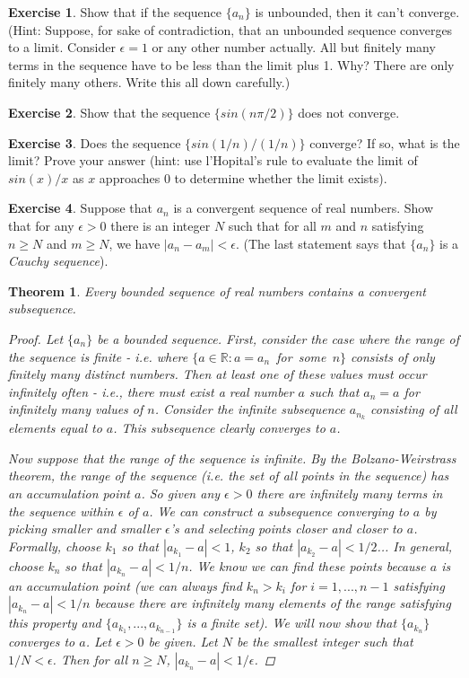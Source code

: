 \documentclass[11pt,a4paper]{report}
\theoremstyle{plain}
\newtheorem{thm}{Theorem}[section]
\theoremstyle{definition}
\newtheorem{exercise}{Exercise}[section]
\theoremstyle{remark}
\begin{document}
\begin{exercise} Show that if the sequence $\{a_n\}$ is unbounded, then it can't converge. (Hint: Suppose, for sake of contradiction, that an unbounded sequence converges to a limit. Consider $\epsilon = 1$ or any other number actually. All but finitely many terms in the sequence have to be less than the limit plus 1. Why?  There are only finitely many others.  Write this all down carefully.)
\end{exercise}
\begin{exercise} Show that the sequence $\{sin(n \pi / 2)\}$ does not converge.
\end{exercise}
\begin{exercise}
Does the sequence $\{sin(1/n) / (1/n)\}$ converge?  If so, what is the limit? Prove your answer (hint: use l'Hopital's rule to evaluate the limit of $sin(x) / x$ as $x$ approaches $0$ to determine whether the limit exists).
\end{exercise}
\begin{exercise}
Suppose that ${a_n}$ is a convergent sequence of real numbers.  Show that for any $\epsilon > 0$ there is an integer $N$ such that for all $m$ and $n$ satisfying $n \geq N$ and $m \geq N$, we have $|a_n - a_m|< \epsilon$. (The last statement says that $\{a_n\}$ is a \textit{Cauchy sequence}).
\end{exercise}
\begin{thm}
Every bounded sequence of real numbers contains a convergent subsequence.
\begin{proof}
Let $\{a_n\}$ be a bounded sequence. First, consider the case where the range of the sequence is finite - i.e. where \mbox{$\{a \in \mathbb{R} \colon a = a_n $ for some $n\}$} consists of only finitely many distinct numbers. Then at least one of these values must occur infinitely often - i.e., there must exist a real number $a$ such that $a_n = a$ for infinitely many values of $n$.  Consider the infinite subsequence ${a_{n_k}}$ consisting of all elements equal to $a$.  This subsequence clearly converges to $a$.

Now suppose that the range of the sequence is infinite. By the Bolzano-Weirstrass theorem, the range of the sequence (i.e. the set of all points in the sequence) has an accumulation point $a$. So given any $\epsilon>0$ there are infinitely many terms in the sequence within $\epsilon$ of $a$.  We can construct a subsequence converging to $a$ by picking smaller and smaller $\epsilon$'s and selecting points closer and closer to $a$.  Formally, choose $k_1$ so that $|a_{k_1} - a| < 1$, $k_2$ so that $|a_{k_2} - a| < 1/2$...  In general, choose $k_n$ so that $|a_{k_n} - a| < 1/n$.  We know we can find these points because $a$ is an accumulation point (we can always find $k_n > k_i$ for $i = 1,..., n - 1$ satisfying $|a_{k_n} - a| < 1/n$ because there are infinitely many elements of the range satisfying this property and $\{a_{k_1}, ..., a_{k_{n-1}}\}$ is a finite set).  We will now show that $\{a_{k_n}\}$ converges to $a$.  Let $\epsilon>0$ be given. Let $N$ be the smallest integer such that $1/N < \epsilon$.  Then for all $n \geq N$, $|a_{k_n} - a| < 1/\epsilon$.
\end{proof}
\end{thm}
\end{document}
